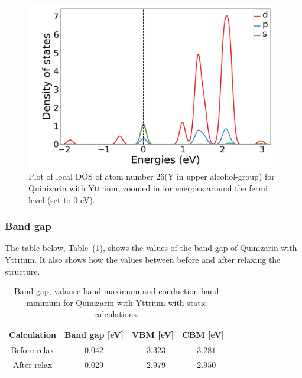 \documentclass{article}
\begin{document}
      \begin{figure}[H]
          \centering
          \includegraphics[width = 11cm]{../fig/Y_LDOS26_2.png}
          \caption{Plot of local DOS of atom number 26(Y in upper alcohol-group) for Quinizarin with Yttrium, zoomed in for energies around the fermi level (set to 0 eV). }
          \label{fig:Y_LDOS26_2}
      \end{figure}

      \vspace{1cm}

    \subsubsection{Band gap}

      The table below, Table~(\ref{tab:bandgapY}), shows the values of the band gap of Quinizarin with Yttrium. It also shows how the values between before and after relaxing the structure. \\

      \begin{table}[H]
        \centering
        \caption{Band gap, valance band maximum and conduction band minimum for Quinizarin with Yttrium with static calculations. }
        \vspace{0mm}
        \label{tab:bandgapY}
        \begin{tabular}{|c|c|c|c|}
            \hline
            Calculation & Band gap [eV] & VBM [eV] & CBM [eV]  \\
            \hline \hline
            Before relax & $0.042$ & $-3.323$ & $-3.281$ \\
            After relax & $0.029$ & $-2.979$ & $-2.950$ \\
            \hline
        \end{tabular} \\
        \hspace{0pt}\\
      \end{table}
\end{document}
